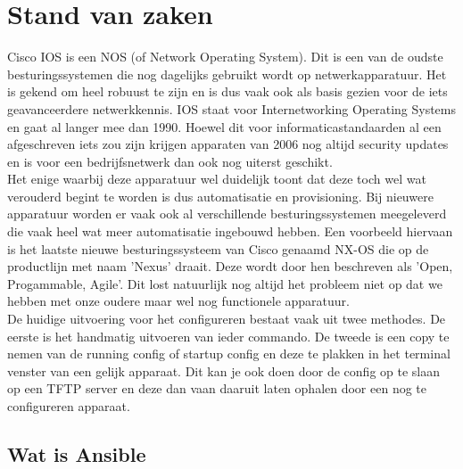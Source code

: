 
\section{Stand van zaken}
\label{sec:stand-van-zaken}
Cisco IOS is een NOS (of Network Operating System). Dit is een van de oudste besturingssystemen die nog dagelijks gebruikt wordt op netwerkapparatuur. Het is gekend om heel robuust te zijn en is dus vaak ook als basis gezien voor de iets geavanceerdere netwerkkennis. IOS staat voor Internetworking Operating Systems en gaat al langer mee dan 1990. Hoewel dit voor informaticastandaarden al een afgeschreven iets zou zijn krijgen apparaten van 2006 nog altijd security updates en is voor een bedrijfsnetwerk dan ook nog uiterst geschikt. \autocite{historyOfCiscoCli} 
\\

Het enige waarbij deze apparatuur wel duidelijk toont dat deze toch wel wat verouderd begint te worden is dus automatisatie en  provisioning. Bij nieuwere apparatuur worden er vaak ook al verschillende besturingssystemen meegeleverd die vaak heel wat meer automatisatie ingebouwd hebben. Een voorbeeld hiervaan is het laatste nieuwe besturingssysteem van Cisco genaamd NX-OS die op de productlijn met naam 'Nexus' draait. Deze wordt door hen beschreven als 'Open, Progammable,  Agile'. Dit lost natuurlijk nog altijd het probleem niet op dat we hebben met onze oudere maar wel nog functionele apparatuur. \autocite{ciscoNxos}
\\

De huidige uitvoering voor het configureren bestaat vaak uit twee methodes. De eerste is het handmatig uitvoeren van ieder commando. De tweede is een copy te nemen van de running config of startup config en deze te plakken in het terminal venster van een gelijk apparaat. Dit kan je ook doen door de config op te slaan op een TFTP server en deze dan vaan daaruit laten ophalen door een nog te configureren apparaat.

\subsection{Wat is Ansible}
\label{sec:whatisansible}

